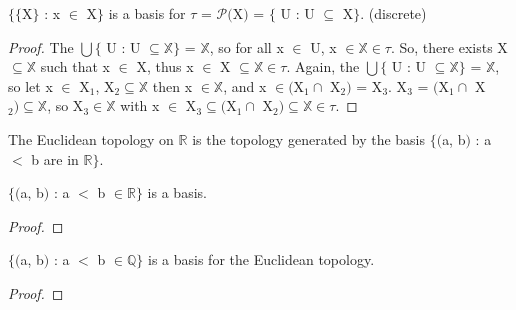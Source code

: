\documentclass{article}
\begin{document}
	\begin{theorem}
	$\lbrace\lbrace$X$\rbrace$ : x $\in$ X$\rbrace$ is a basis for $\tau$ = $\mathcal{P}($X$)$ = $\lbrace$ U : U $\subseteq$ X$\rbrace$. (discrete)
	\end{theorem}
	\begin{proof}
	The $\bigcup \lbrace$ U : U $\subseteq \mathbb{X} \rbrace$ = $\mathbb{X}$, so for all x $\in$ U, x $\in \mathbb{X} \in \tau$. So, there exists X $\subseteq \mathbb{X}$ such that x $\in$ X, thus x $\in$ X $\subseteq \mathbb{X} \in \tau$. Again, the $\bigcup \lbrace$ U : U $\subseteq \mathbb{X} \rbrace$ = $\mathbb{X}$, so let x $\in$ X$_1$, X$_2 \subseteq \mathbb{X}$ then x $\in \mathbb{X}$, and x $\in ($X$_1 \cap$ X$_2)$ = X$_3$. X$_3$ = $($X$_1 \cap$ X$_2) \subseteq \mathbb{X}$, so X$_3 \in \mathbb{X}$ with x $\in$ X$_3 \subseteq ($X$_1 \cap$ X$_2) \subseteq \mathbb{X} \in \tau$.
	\end{proof}

	\begin{definition}
	The Euclidean topology on $\mathbb{R}$ is the topology generated by the basis $\lbrace($a, b$)$ : a $<$ b are in $\mathbb{R}\rbrace$.
	\end{definition}

	\begin{theorem}
	$\lbrace($a, b$)$ : a $<$ b $\in \mathbb{R}\rbrace$ is a basis.
	\end{theorem}
	\begin{proof}
	\end{proof}

	\begin{theorem}
	$\lbrace($a, b$)$ : a $<$ b $\in \mathbb{Q}\rbrace$ is a basis for the Euclidean topology.
	\end{theorem}
	\begin{proof}
	\end{proof}
\end{document}
